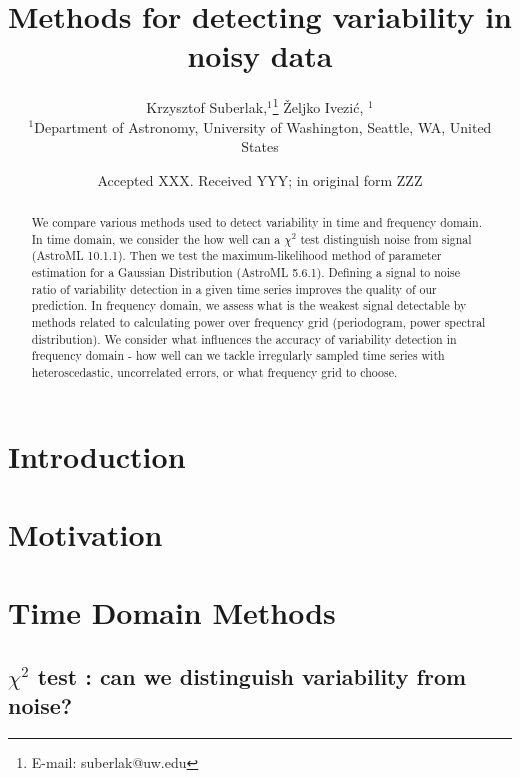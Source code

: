 \documentclass[fleqn,usenatbib]{mnras}  %
\title[Variability detection]{Methods for detecting variability in noisy data}
\author[K. Suberlak et al.]{
Krzysztof Suberlak,$^{1}$\thanks{E-mail: suberlak@uw.edu}
\v{Z}eljko Ivezi\'c, $^{1}$
\\
$^{1}$Department of Astronomy, University of Washington, Seattle, WA, United States\\
}
\date{Accepted XXX. Received YYY; in original form ZZZ}
\begin{document}
\label{firstpage}
\pagerange{\pageref{firstpage}--\pageref{lastpage}}
\maketitle

\begin{abstract}

We compare various methods used to detect variability in time and frequency domain. In time domain, we consider the how well can a  $\chi^{2}$ test distinguish noise from signal (AstroML 10.1.1). Then we test the maximum-likelihood method of parameter estimation for a Gaussian Distribution (AstroML 5.6.1). Defining a signal to noise ratio of variability detection in a given time series improves the quality of our prediction.  
In frequency domain, we assess what is the weakest signal detectable by methods related to calculating power over frequency grid (periodogram, power spectral distribution). We consider what influences the accuracy of variability detection in frequency domain - how well can we tackle irregularly sampled time series with  heteroscedastic, uncorrelated errors, or what frequency grid to choose.  

\end{abstract}




\section{Introduction} 

\section{Motivation}

\section{Time Domain Methods}



%
%

\subsection{ $\chi^{2}$ test : can we distinguish variability from noise?}
\end{document}
